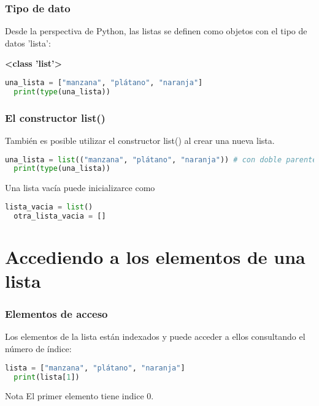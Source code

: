 \begin{frame}[fragile]
  \frametitle{Tipo de dato}

  Desde la perspectiva de Python, las listas se definen
  como objetos con el tipo de datos 'lista':

  \vspace{\baselineskip}
  \textbf{<class 'list'>}

  \vspace{\baselineskip}
  \begin{lstlisting}[language=Python]
  una_lista = ["manzana", "plátano", "naranja"]
  print(type(una_lista)) 
  \end{lstlisting}
\end{frame}

\begin{frame}[fragile]
  \frametitle{El constructor list()}

  También es posible utilizar el constructor
  \textcolor{codeKeyword}{list}() al crear una nueva lista. 

  \vspace{\baselineskip}
  \begin{lstlisting}[language=Python]
  una_lista = list(("manzana", "plátano", "naranja")) # con doble parentesis
  print(type(una_lista)) 
  \end{lstlisting}

  \vspace{\baselineskip}
  Una lista vacía puede inicializarce como

  \vspace{\baselineskip}
  \begin{lstlisting}[language=Python]
  lista_vacia = list()
  otra_lista_vacia = []
  \end{lstlisting}

\end{frame}

\section{Accediendo a los elementos de una lista}

\begin{frame}[fragile]
  \frametitle{Elementos de acceso}

  Los elementos de la lista están indexados y puede acceder
  a ellos consultando el número de índice:

  \vspace{\baselineskip}
  \begin{lstlisting}[language=Python]
  lista = ["manzana", "plátano", "naranja"]
  print(lista[1]) 
  \end{lstlisting}

  \begin{exampleblock}{Nota}
    El primer elemento tiene indice 0.
  \end{exampleblock}
\end{frame}

